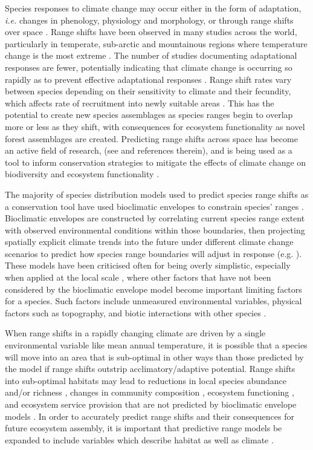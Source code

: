 \documentclass[a4paper, 11pt]{article}
\begin{document}
Species responses to climate change may occur either in the form of adaptation, \textit{i.e.} changes in phenology, physiology and morphology, or through range shifts over space \citep{Bellard2012}. Range shifts have been observed in many studies across the world, particularly in temperate, sub-arctic and mountainous regions where temperature change is the most extreme \citep{Lenoir2015}. The number of studies documenting adaptational responses are fewer, potentially indicating that climate change is occurring so rapidly as to prevent effective adaptational responses \citep{Mantyka2012}. Range shift rates vary between species depending on their sensitivity to climate and their fecundity, which affects rate of recruitment into newly suitable areas \citep{MacLean2017, Travis2013}. This has the potential to create new species assemblages as species ranges begin to overlap more or less as they shift, with consequences for ecosystem functionality as novel forest assemblages are created. Predicting range shifts across space has become an active field of research, (see \citealt{Bellard2012} and references therein), and is being used as a tool to inform conservation strategies to mitigate the effects of climate change on biodiversity and ecosystem functionality \citep{Dawson2011}.

The majority of species distribution models used to predict species range shifts as a conservation tool have used bioclimatic envelopes to constrain species' ranges \citep{Pearson2003, Sinclair2010}. Bioclimatic envelopes are constructed by correlating current species range extent with observed environmental conditions within those boundaries, then projecting spatially explicit climate trends into the future under different climate change scenarios to predict how species range boundaries will adjust in response (e.g. \citealt{Araujo2006, Berry2002, Peterson2002, Thuiller2005}). These models have been criticised often for being overly simplistic, especially when applied at the local scale \citep{McMahon2011}, where other factors that have not been considered by the bioclimatic envelope model become important limiting factors for a species. Such factors include unmeasured environmental variables, physical factors such as topography, and biotic interactions with other species \citep{Davis1998, Ettinger2011, Putten2010}. 

When range shifts in a rapidly changing climate are driven by a single environmental variable like mean annual temperature, it is possible that a species will move into an area that is sub-optimal in other ways than those predicted by the model if range shifts outstrip acclimatory/adaptive potential. Range shifts into sub-optimal habitats may lead to reductions in local species abundance and/or richness \citep{Colwell2008}, changes in community composition \citep{}, ecosystem functioning \citep{Bellard2012}, and ecosystem service provision that are not predicted by bioclimatic envelope models \citep{Dobson2011, Isbell2011}. In order to accurately predict range shifts and their consequences for future ecosystem assembly, it is important that predictive range models be expanded to include variables which describe habitat as well as climate \citep{Wisz2013}.
\end{document}
